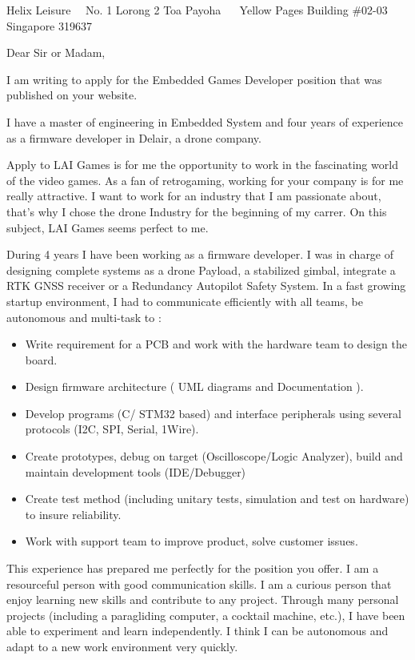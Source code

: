 \documentclass{scrlttr2}
\renewcommand{\\}{\ {\large\textperiodcentered}\ }
\begin{document}

\begin{letter}{ %
Helix Leisure\\
No. 1 Lorong 2 Toa Payoha \\
Yellow Pages Building  \#02-03 \\
Singapore 319637 \\
}


\opening{Dear Sir or Madam,}

I am writing to apply for the Embedded Games Developer position that was published on your website.

I have a master of engineering in Embedded System and four years of experience
as a firmware developer in Delair, a drone company.

Apply to LAI Games is
for me the opportunity to work in the fascinating world of the video games. As a fan of retrogaming, working for your company is for me really attractive.
I want to work for an industry that I am passionate about, that's why I chose the drone Industry for the beginning of my carrer.
On this subject, LAI Games seems perfect to me.

During 4 years I have been working as a firmware developer. I was in charge of
designing complete systems as a drone Payload, a stabilized gimbal, integrate a RTK
GNSS receiver or a Redundancy Autopilot Safety System. In a fast growing startup environment, I had to
communicate efficiently with all teams, be autonomous and multi-task to :
\begin{itemize}
\item Write requirement for a PCB and work with the hardware team to design the board.
\item Design firmware architecture ( UML diagrams and Documentation ).
\item Develop programs (C/ STM32 based) and interface peripherals using several protocols (I2C, SPI, Serial, 1Wire).
\item Create prototypes, debug on target (Oscilloscope/Logic Analyzer), build and maintain development tools (IDE/Debugger)
\item Create test method (including unitary tests, simulation and test on hardware) to insure reliability.
\item Work with support team to improve product, solve customer issues.
\end{itemize}
This experience has prepared me perfectly for the position you offer. I am a
	resourceful person with good communication skills.
I am a curious person that enjoy learning new skills and contribute to any project.
Through many personal projects (including a paragliding computer, a cocktail machine, etc.), I have been able to experiment and learn independently.
I think I can be autonomous and adapt to a new work environment very quickly.



\end{letter}
\end{document}
